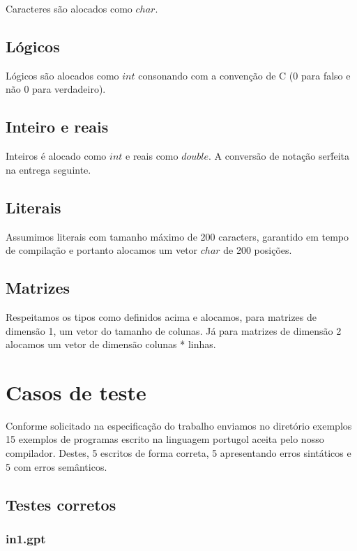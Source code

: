 \documentclass[a4paper,12pt]{report}
\begin{document}
Caracteres s\~ao alocados como $char$.

\subsection{L\'ogicos}

L\'ogicos s\~ao alocados como $int$ consonando com a conven\c{c}\~ao de C (0 para falso e n\~ao 0 para verdadeiro).

\subsection{Inteiro e reais}

Inteiros \'e alocado como $int$ e reais como $double$. A convers\~ao de nota\c{c}\~ao ser\' feita na entrega seguinte.

\subsection{Literais}

Assumimos literais com tamanho m\'aximo de 200 caracters, garantido em tempo de compila\c{c}\~ao e portanto alocamos um vetor $char$ de 200 posi\c{c}\~oes.

\subsection{Matrizes}

Respeitamos os tipos como definidos acima e alocamos, para matrizes de dimens\~ao 1, um vetor do tamanho de colunas. J\'a para matrizes de dimens\~ao 2 alocamos um vetor de dimens\~ao colunas * linhas.

\section{Casos de teste}

Conforme solicitado na especifica\c{c}\~ao do trabalho enviamos no diret\'orio exemplos 15
exemplos de programas escrito na linguagem portugol aceita pelo nosso compilador. 
Destes, 5 escritos de forma correta, 5 apresentando erros sint\'aticos e 5 com erros 
sem\^anticos.


\subsection{Testes corretos}

\subsubsection{in1.gpt}
\end{document}
